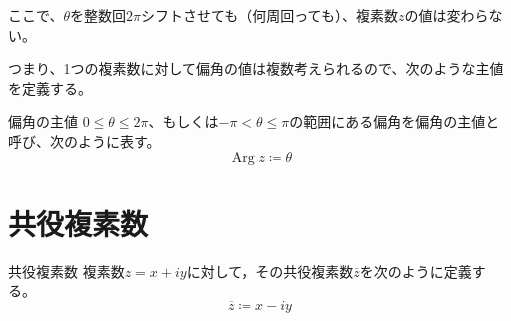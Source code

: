 \documentclass[16pt,b5paper]{book}
\DeclareMathOperator{\Arg}{Arg}
\begin{document}
ここで、$\theta$を整数回$2\pi$シフトさせても（何周回っても）、複素数$z$の値は変わらない。

つまり、1つの複素数に対して偏角の値は複数考えられるので、次のような主値を定義する。

\begin{definition}{偏角の主値}
  \newline
  $0\leq \theta \leq 2\pi$、もしくは$-\pi < \theta \leq \pi$の範囲にある偏角を偏角の主値と呼び、次のように表す。
  \LARGE
  \begin{equation}
    \Arg z \coloneqq \theta
  \end{equation}
\end{definition}

\section{共役複素数}

\begin{definition}{共役複素数}
  \newline
  複素数$z=x+iy$に対して，その共役複素数$\overline{z}$を次のように定義する。
  \LARGE
  \begin{equation}
    \overline{z}\coloneqq x-iy
  \end{equation}
\end{definition}
\end{document}
